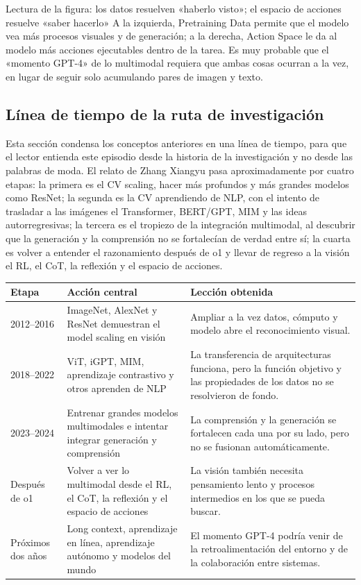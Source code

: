 \begin{knowledgebox}{Lectura de la figura: los datos resuelven «haberlo visto»; el espacio de acciones resuelve «saber hacerlo»}
A la izquierda, Pretraining Data permite que el modelo vea más procesos visuales y de generación; a la derecha, Action Space le da al modelo más acciones ejecutables dentro de la tarea. Es muy probable que el «momento GPT-4» de lo multimodal requiera que ambas cosas ocurran a la vez, en lugar de seguir solo acumulando pares de imagen y texto.
\end{knowledgebox}

\subsection{Línea de tiempo de la ruta de investigación}

Esta sección condensa los conceptos anteriores en una línea de tiempo, para que el lector entienda este episodio desde la historia de la investigación y no desde las palabras de moda. El relato de Zhang Xiangyu pasa aproximadamente por cuatro etapas: la primera es el CV scaling, hacer más profundos y más grandes modelos como ResNet; la segunda es la CV aprendiendo de NLP, con el intento de trasladar a las imágenes el Transformer, BERT/GPT, MIM y las ideas autorregresivas; la tercera es el tropiezo de la integración multimodal, al descubrir que la generación y la comprensión no se fortalecían de verdad entre sí; la cuarta es volver a entender el razonamiento después de o1 y llevar de regreso a la visión el RL, el CoT, la reflexión y el espacio de acciones.

\noindent\begin{tabularx}{\textwidth}{p{}p{}X}
\toprule
Etapa & Acción central & Lección obtenida \\
\midrule
2012--2016 & ImageNet, AlexNet y ResNet demuestran el model scaling en visión & Ampliar a la vez datos, cómputo y modelo abre el reconocimiento visual. \\
2018--2022 & ViT, iGPT, MIM, aprendizaje contrastivo y otros aprenden de NLP & La transferencia de arquitecturas funciona, pero la función objetivo y las propiedades de los datos no se resolvieron de fondo. \\
2023--2024 & Entrenar grandes modelos multimodales e intentar integrar generación y comprensión & La comprensión y la generación se fortalecen cada una por su lado, pero no se fusionan automáticamente. \\
Después de o1 & Volver a ver lo multimodal desde el RL, el CoT, la reflexión y el espacio de acciones & La visión también necesita pensamiento lento y procesos intermedios en los que se pueda buscar. \\
Próximos dos años & Long context, aprendizaje en línea, aprendizaje autónomo y modelos del mundo & El momento GPT-4 podría venir de la retroalimentación del entorno y de la colaboración entre sistemas. \\
\bottomrule
\end{tabularx}


